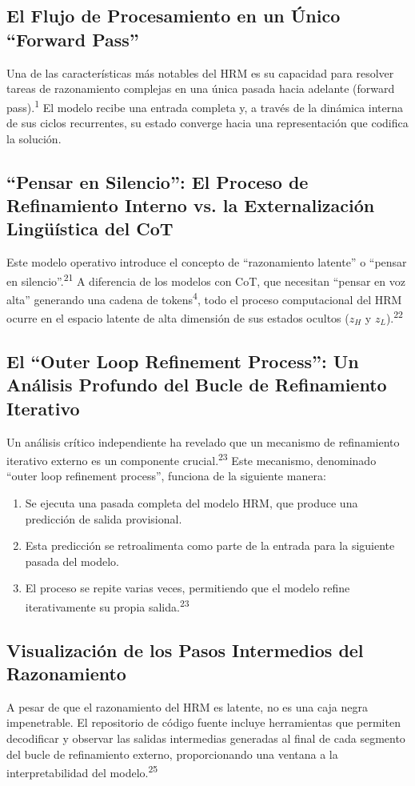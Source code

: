 \documentclass{article}
\begin{document}
	\subsection{El Flujo de Procesamiento en un Único ``Forward Pass''}
	Una de las características más notables del HRM es su capacidad para resolver tareas de razonamiento complejas en una única pasada hacia adelante (forward pass).\textsuperscript{1} El modelo recibe una entrada completa y, a través de la dinámica interna de sus ciclos recurrentes, su estado converge hacia una representación que codifica la solución.
	
	\subsection{``Pensar en Silencio'': El Proceso de Refinamiento Interno vs. la Externalización Lingüística del CoT}
	Este modelo operativo introduce el concepto de ``razonamiento latente'' o ``pensar en silencio''.\textsuperscript{21} A diferencia de los modelos con CoT, que necesitan ``pensar en voz alta'' generando una cadena de tokens\textsuperscript{4}, todo el proceso computacional del HRM ocurre en el espacio latente de alta dimensión de sus estados ocultos (\(z_H\) y \(z_L\)).\textsuperscript{22}
	
	\subsection{El ``Outer Loop Refinement Process'': Un Análisis Profundo del Bucle de Refinamiento Iterativo}
	Un análisis crítico independiente ha revelado que un mecanismo de refinamiento iterativo externo es un componente crucial.\textsuperscript{23} Este mecanismo, denominado ``outer loop refinement process'', funciona de la siguiente manera:
	\begin{enumerate}
		\item Se ejecuta una pasada completa del modelo HRM, que produce una predicción de salida provisional.
		\item Esta predicción se retroalimenta como parte de la entrada para la siguiente pasada del modelo.
		\item El proceso se repite varias veces, permitiendo que el modelo refine iterativamente su propia salida.\textsuperscript{23}
	\end{enumerate}
	
	\subsection{Visualización de los Pasos Intermedios del Razonamiento}
	A pesar de que el razonamiento del HRM es latente, no es una caja negra impenetrable. El repositorio de código fuente incluye herramientas que permiten decodificar y observar las salidas intermedias generadas al final de cada segmento del bucle de refinamiento externo, proporcionando una ventana a la interpretabilidad del modelo.\textsuperscript{25}
	
\end{document}
